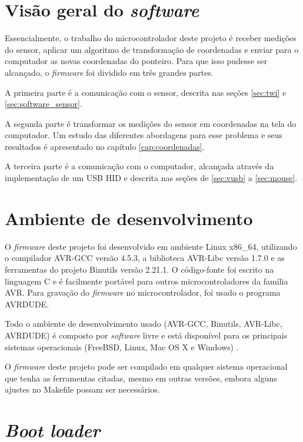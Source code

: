 \documentclass[brazil,pagestart=firstchapter]{abnt}
\begin{document}
\section{Visão geral do \textit{software}}
\label{sec:software_visao_geral}

Essencialmente, o trabalho do microcontrolador deste projeto é receber
medições do sensor, aplicar um algoritmo de transformação de coordenadas e
enviar para o computador as novas coordenadas do ponteiro. Para que isso
pudesse ser alcançado, o \textit{firmware} foi dividido em três grandes
partes.

A primeira parte é a comunicação com o sensor, descrita nas seções
\ref{sec:twi} e \ref{sec:software_sensor}.

A segunda parte é transformar os medições do sensor em coordenadas na tela
do computador. Um estudo das diferentes abordagens para esse problema e seus
resultados é apresentado no capítulo \ref{cap:coordenadas}.

A terceira parte é a comunicação com o computador, alcançada através da
implementação de um \ac{USB} \ac{HID} e descrita nas seções de
\ref{sec:vusb} a \ref{sec:mouse}.


\section{Ambiente de desenvolvimento}
\label{sec:software_ambiente}

O \textit{firmware} deste projeto foi desenvolvido em ambiente Linux x86\_64,
utilizando o compilador AVR-GCC versão 4.5.3, a biblioteca AVR-Libc versão
1.7.0 e as ferramentas do projeto Binutils versão 2.21.1. O código-fonte foi
escrito na linguagem C e é facilmente portável para outros
microcontroladores da família AVR. Para gravação do \textit{firmware} no
microcontrolador, foi usado o programa AVRDUDE.

Todo o ambiente de desenvolvimento usado (AVR-GCC, Binutils, AVR-Libc,
AVRDUDE) é composto por \textit{software} livre e está disponível para os
principais sistemas operacionais (FreeBSD, Linux, Mac OS X e Windows)
\cite{avrlibcoverview}.

O \textit{firmware} deste projeto pode ser compilado em qualquer sistema
operacional que tenha as ferramentas citadas, mesmo em outras versões,
embora alguns ajustes no Makefile possam ser necessários.


\section{\textit{Boot loader}}
\label{sec:bootloader}
\end{document}
